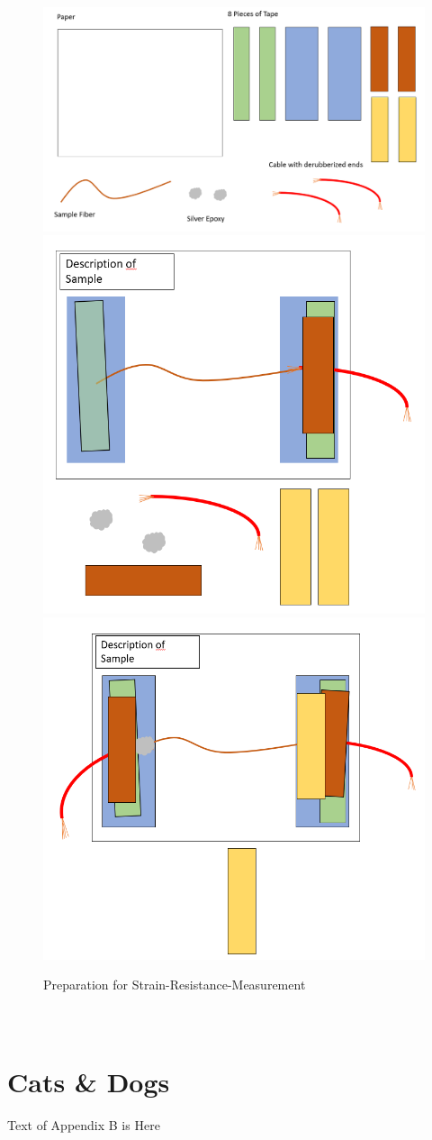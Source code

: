 \begin{figure}[hb]
    \centering
    \includegraphics[width=.4\textwidth]{Meas_Prep_1.PNG}
    \includegraphics[width=.4\textwidth]{Meas_Prep_2.PNG}
    \includegraphics[width=.4\textwidth]{Meas_Prep_3.PNG}
    \caption{Preparation for Strain-Resistance-Measurement}
    \label{fig:my_label}
\end{figure}


\section{\\Cats \& Dogs}

Text of Appendix B is Here





